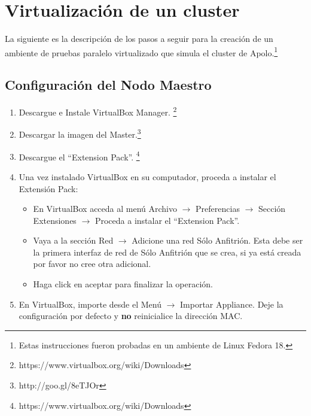 \section{Virtualización de un cluster}


La siguiente es la descripción de los pasos a seguir para la creación de un ambiente de pruebas paralelo virtualizado que simula el cluster de Apolo.\footnote{Estas instrucciones fueron probadas en un ambiente de Linux Fedora 18.}


\subsection{Configuración del Nodo Maestro}
\begin{enumerate}

\item Descargue e Instale VirtualBox Manager. \footnote{https://www.virtualbox.org/wiki/Downloads}

\item Descargar la imagen del Master.\footnote{http://goo.gl/8eTJOr}

\item Descargue el ``Extension Pack''. \footnote{https://www.virtualbox.org/wiki/Downloads}

\item Una vez instalado VirtualBox en su computador, proceda a instalar el Extensión Pack: 

\begin{itemize}
	
	\item En VirtualBox acceda al menú Archivo $\rightarrow$ Preferencias $\rightarrow$ Sección Extensiones $\rightarrow$ Proceda a instalar el ``Extension Pack''. 

	\item Vaya a la sección Red $\rightarrow$ Adicione una red Sólo Anfitrión. Esta debe ser la primera interfaz de red de Sólo Anfitrión que se crea, si ya está creada por favor no cree otra adicional.

	\item Haga click en aceptar para finalizar la operación.

\end{itemize}

\item En VirtualBox, importe desde el Menú $\rightarrow$ Importar Appliance. Deje la configuración por defecto y \textbf{no} reinicialice la dirección MAC.


\end{enumerate}

